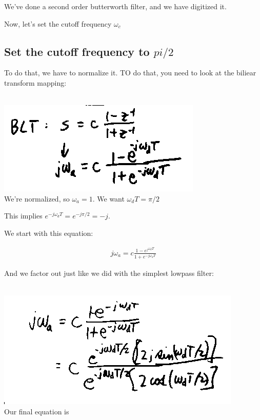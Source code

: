 We've done a second order butterworth filter, and we have digitized it.

Now, let's set the cutoff frequency $\omega_c$

\subsection*{Set the cutoff frequency to $pi/2$}

To do that, we have to normalize it. TO do that, you need to look
at the biliear transform mapping:

\\
\includegraphics[scale=0.5]{frames/17k}\\

We're normalized, so $\omega_a = 1$. We want $\omega_d T = \pi/2$

This implies $e^{-j\omega_d T} = e^{-j\pi/2} = -j$.

We start with this equation:

\begin{align*}
j\omega_a = c \frac{1 - e^{_j\omega_d T}}{1 + e^{-j \omega_d T}}
\end{align*}

And we factor out just like we did with the simplest lowpass filter:

\\
\includegraphics[scale=0.5]{frames/17l}\\

Our final equation is

